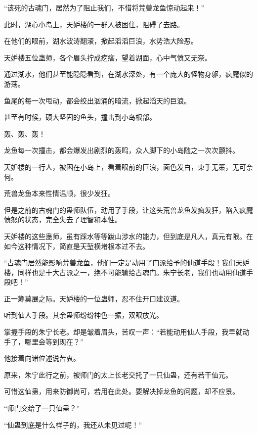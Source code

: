
\begin{this_body}



“该死的古魂门，居然为了阻止我们，不惜将荒兽龙鱼惊动起来！”

此时，湖心小岛上，天妒楼的一群人被困住，阻碍了去路。

在他们的眼前，湖水波涛翻滚，掀起滔滔巨浪，水势浩大险恶。

天妒楼五位蛊师，各个眉头拧成疙瘩，望着湖面，心中气愤又无奈。

通过湖水，他们甚至能隐隐看到，在湖水深处，有一个庞大的怪物身躯，疯魔似的游荡。

鱼尾的每一次甩动，都会绞出汹涌的暗流，掀起滔天的巨浪。

甚至有时候，硕大坚固的鱼头，撞击到小岛根部。

轰、轰、轰！

龙鱼每一次撞击，都会爆发出剧烈的轰鸣，众人脚下的小岛随之一次次颤抖。

天妒楼的一行人，被困在小岛上，看着眼前的巨浪，面色发白，束手无策，无可奈何。

荒兽龙鱼本来性情温顺，很少发狂。

但是之前的古魂门的蛊师队伍，动用了手段，让这头荒兽龙鱼发疯发狂，陷入疯魔愤怒的状态，完全失去了理智和本性。

天妒楼的这些蛊师，虽有踩水等等跋山涉水的能力，但到底是凡人，真元有限。在如今这种情况下，简直是天堑横堵根本过不去。

“古魂门居然能影响荒兽龙鱼，他们一定是动用了门派给予的仙道手段！我们天妒楼，同样也是十大古派之一，绝不可能输给古魂门。朱宁长老，我们也动用仙道手段吧！”

正一筹莫展之际。天妒楼的一位蛊师，忍不住开口建议道。

听到仙人手段。其余蛊师纷纷神色一振，双眼放光。

掌握手段的朱宁长老。却是皱着眉头，苦叹一声：“若能动用仙人手段，我早就动手了，哪里会等到现在？”

他接着向诸位述说苦衷。

原来，朱宁此行之前，被师门的太上长老交托了一只仙蛊，还有若干仙元。

可惜这仙蛊，用来防御尚可，若用在此处。要解决掉龙鱼的问题，却不应景。

“师门交给了一只仙蛊？”

“仙蛊到底是什么样子的，我还从未见过呢！”


\end{this_body}

